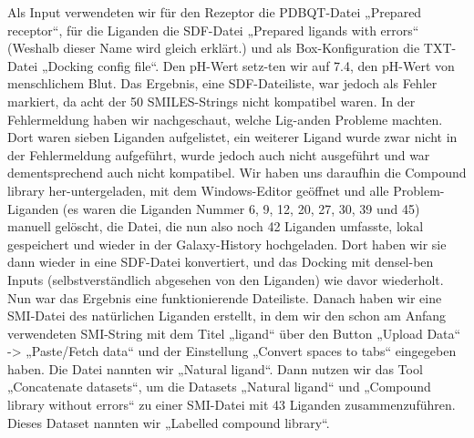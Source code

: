 \documentclass[11pt]{article}
\begin{document}
{    Als Input verwendeten wir für den Rezeptor die PDBQT-Datei „Prepared receptor“, für die Liganden die SDF-Datei „Prepared ligands with errors“ (Weshalb dieser Name wird gleich erklärt.) und als Box-Konfiguration die TXT-Datei „Docking config file“. Den pH-Wert setz-ten wir auf 7.4, den pH-Wert von menschlichem Blut.
    Das Ergebnis, eine SDF-Dateiliste, war jedoch als Fehler markiert, da acht der 50 SMILES-Strings nicht kompatibel waren. In der Fehlermeldung haben wir nachgeschaut, welche Lig-anden Probleme machten. Dort waren sieben Liganden aufgelistet, ein weiterer Ligand wurde zwar nicht in der Fehlermeldung aufgeführt, wurde jedoch auch nicht ausgeführt und war dementsprechend auch nicht kompatibel. Wir haben uns daraufhin die Compound library her-untergeladen, mit dem Windows-Editor geöffnet und alle Problem-Liganden (es waren die Liganden Nummer 6, 9, 12, 20, 27, 30, 39 und 45) manuell gelöscht, die Datei, die nun also noch 42 Liganden umfasste, lokal gespeichert und wieder in der Galaxy-History hochgeladen. Dort haben wir sie dann wieder in eine SDF-Datei konvertiert, und das Docking mit densel-ben Inputs (selbstverständlich abgesehen von den Liganden) wie davor wiederholt.
    Nun war das Ergebnis eine funktionierende Dateiliste.
    Danach haben wir eine SMI-Datei des natürlichen Liganden erstellt, in dem wir den schon am Anfang verwendeten SMI-String mit dem Titel „ligand“ über den Button „Upload Data“ -> „Paste/Fetch data“ und der Einstellung „Convert spaces to tabs“ eingegeben haben. Die Datei nannten wir „Natural ligand“.
    Dann nutzen wir das Tool „Concatenate datasets“, um die Datasets „Natural ligand“ und „Compound library without errors“ zu einer SMI-Datei mit 43 Liganden zusammenzuführen. Dieses Dataset nannten wir „Labelled compound library“.

}
\end{document}

